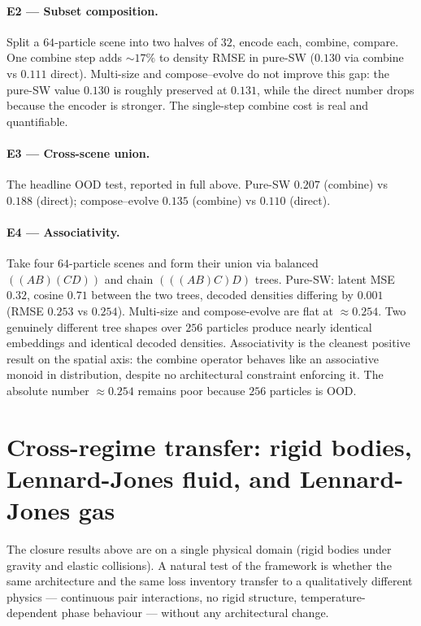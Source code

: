\documentclass[11pt]{article}
\begin{document}
\paragraph{E2 --- Subset composition.} Split a $64$-particle scene into two halves of $32$, encode each, combine, compare. One combine step adds $\sim 17\%$ to density RMSE in pure-SW ($0.130$ via combine vs $0.111$ direct). Multi-size and compose--evolve do not improve this gap: the pure-SW value $0.130$ is roughly preserved at $0.131$, while the direct number drops because the encoder is stronger. The single-step combine cost is real and quantifiable.

\paragraph{E3 --- Cross-scene union.} The headline OOD test, reported in full above. Pure-SW $0.207$ (combine) vs $0.188$ (direct); compose--evolve $0.135$ (combine) vs $0.110$ (direct).

\paragraph{E4 --- Associativity.} Take four $64$-particle scenes and form their union via balanced $((AB)(CD))$ and chain $(((AB)C)D)$ trees. Pure-SW: latent MSE $0.32$, cosine $0.71$ between the two trees, decoded densities differing by $0.001$ (RMSE $0.253$ vs $0.254$). Multi-size and compose-evolve are flat at $\approx 0.254$. Two genuinely different tree shapes over $256$ particles produce nearly identical embeddings and identical decoded densities. Associativity is the cleanest positive result on the spatial axis: the combine operator behaves like an associative monoid in distribution, despite no architectural constraint enforcing it. The absolute number $\approx 0.254$ remains poor because $256$ particles is OOD.

\section{Cross-regime transfer: rigid bodies, Lennard-Jones fluid, and Lennard-Jones gas}
\label{sec:lj}

The closure results above are on a single physical domain (rigid bodies under gravity and elastic collisions). A natural test of the framework is whether the same architecture and the same loss inventory transfer to a qualitatively different physics --- continuous pair interactions, no rigid structure, temperature-dependent phase behaviour --- without any architectural change.
\end{document}
